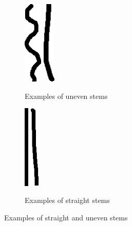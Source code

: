 \begin{figure}[h!]
    \centering
    \begin{subfigure}[b]{.4\linewidth}
        \centering
        \includegraphics[height=4cm]{gfx/implementation/stem-straightness/4912.png}
        \quad
        \includegraphics[height=4cm]{gfx/implementation/stem-straightness/5371.png}
        \caption{Examples of uneven stems}
        \label{fig:wonky-stems}
    \end{subfigure}
    \begin{subfigure}[b]{.4\linewidth}
        \centering
        \includegraphics[height=4cm]{gfx/implementation/stem-straightness/3876.png}
        \quad
        \includegraphics[height=4cm]{gfx/implementation/stem-straightness/5104.png}
        \caption{Examples of straight stems}
        \label{fig:straight-stems}
    \end{subfigure}

    \caption{Examples of straight and uneven stems}
    \label{fig:stem-straightness-examples}
\end{figure}

